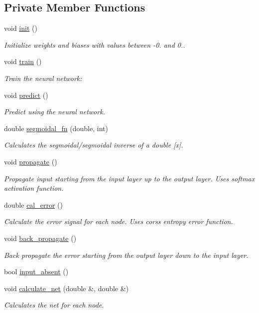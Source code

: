 \subsection*{Private Member Functions}
\begin{DoxyCompactItemize}
\item 
void \hyperlink{a00003_ac86567c994bb671c20ed50316d268d3b}{init} ()
\begin{DoxyCompactList}\small\item\em Initialize weights and biases with values between -\/0. and 0.. \end{DoxyCompactList}\item 
void \hyperlink{a00003_a033f4f60812c0359cc50815e957f11f7}{train} ()
\begin{DoxyCompactList}\small\item\em Train the neural network\-: \end{DoxyCompactList}\item 
void \hyperlink{a00003_aff80304f6d257107092c521198eab68b}{predict} ()
\begin{DoxyCompactList}\small\item\em Predict using the neural network. \end{DoxyCompactList}\item 
double \hyperlink{a00003_a7a8eff736645e4101ed906a46e6a27ac}{segmoidal\-\_\-fn} (double, int)
\begin{DoxyCompactList}\small\item\em Calculates the segmoidal/segmoidal inverse of a double \mbox{[}x\mbox{]}. \end{DoxyCompactList}\item 
void \hyperlink{a00003_a7e6d776ecfbb4f9df682d5fe13a7ec3b}{propagate} ()
\begin{DoxyCompactList}\small\item\em Propagate input starting from the input layer up to the output layer. Uses softmax activation function. \end{DoxyCompactList}\item 
double \hyperlink{a00003_a3e503ddab5bbc51f6e0b79b67ca6ed2f}{cal\-\_\-error} ()
\begin{DoxyCompactList}\small\item\em Calculate the error signal for each node. Uses corss entropy error function. \end{DoxyCompactList}\item 
void \hyperlink{a00003_a5a0cac77d13e3ffdd3088cb684d39859}{back\-\_\-propagate} ()
\begin{DoxyCompactList}\small\item\em Back propagate the error starting from the output layer down to the input layer. \end{DoxyCompactList}\item 
bool \hyperlink{a00003_a3d073d4957def9b6a4498448260fedeb}{input\-\_\-absent} ()
\item 
void \hyperlink{a00003_a25df8564c3f26b64935464366055572e}{calculate\-\_\-net} (double \&, double \&)
\begin{DoxyCompactList}\small\item\em Calculates the net for each node. \end{DoxyCompactList}\end{DoxyCompactItemize}
